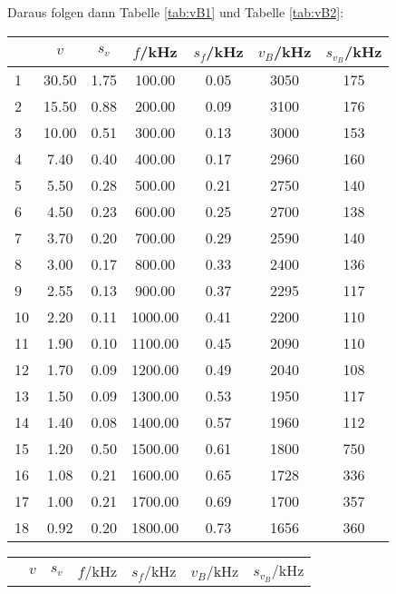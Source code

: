 \newpage
Daraus folgen dann Tabelle \ref{tab:vB1} und Tabelle \ref{tab:vB2}:
\begin{center}
    \begin{tabular}{l | c c c c | c c}
        {} &      $v$ &   $s_v$ &   $f$/kHz &   $s_f$/kHz &  $v_B$/kHz &  $s_{v_B}$/kHz \\
        \hline
        1  &  30.50 &  1.75 &   100.00 &  0.05 &   3050 &   175 \\ 
        2  &  15.50 &  0.88 &   200.00 &  0.09 &   3100 &   176 \\ 
        3  &  10.00 &  0.51 &   300.00 &  0.13 &   3000 &   153 \\ 
        4  &   7.40 &  0.40 &   400.00 &  0.17 &   2960 &   160 \\ 
        5  &   5.50 &  0.28 &   500.00 &  0.21 &   2750 &   140 \\ 
        6  &   4.50 &  0.23 &   600.00 &  0.25 &   2700 &   138 \\ 
        7  &   3.70 &  0.20 &   700.00 &  0.29 &   2590 &   140 \\ 
        8  &   3.00 &  0.17 &   800.00 &  0.33 &   2400 &   136 \\ 
        9  &   2.55 &  0.13 &   900.00 &  0.37 &   2295 &   117 \\ 
        10 &   2.20 &  0.11 &  1000.00 &  0.41 &   2200 &   110 \\ 
        11 &   1.90 &  0.10 &  1100.00 &  0.45 &   2090 &   110 \\ 
        12 &   1.70 &  0.09 &  1200.00 &  0.49 &   2040 &   108 \\ 
        13 &   1.50 &  0.09 &  1300.00 &  0.53 &   1950 &   117 \\ 
        14 &   1.40 &  0.08 &  1400.00 &  0.57 &   1960 &   112 \\ 
        15 &   1.20 &  0.50 &  1500.00 &  0.61 &   1800 &   750 \\ 
        16 &   1.08 &  0.21 &  1600.00 &  0.65 &   1728 &   336 \\ 
        17 &   1.00 &  0.21 &  1700.00 &  0.69 &   1700 &   357 \\ 
        18 &   0.92 &  0.20 &  1800.00 &  0.73 &   1656 &   360 \\ 
    \end{tabular}
    \label{tab:vB1}
    \begin{tabular}{l | c c c c | c c}
        {} &      $v$ &   $s_v$ &   $f$/kHz &   $s_f$/kHz &  $v_B$/kHz &  $s_{v_B}$/kHz \\

\end{tabular}
\end{center}
